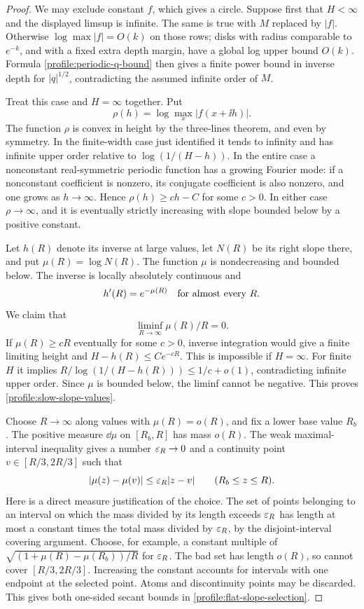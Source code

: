 \begin{proof}
We may exclude constant \(f\), which gives a circle. Suppose first
that \(H<\infty\) and the displayed limsup is infinite. The same
is true with \(M\) replaced by \(|f|\). Otherwise
\(\log\max|f|=O(k)\) on those rows; disks with radius comparable
to \(e^{-k}\), and with a fixed extra depth margin, have a global
log upper bound \(O(k)\). Formula
\eqref{profile:periodic-q-bound} then gives a finite power bound in
inverse depth for \(|q|^{1/2}\), contradicting the assumed infinite
order of \(M\).

Treat this case and \(H=\infty\) together. Put
\[
 \rho(h)=\log\max_x|f(x+\ii h)|.
\]
The function \(\rho\) is convex in height by the three-lines
theorem, and even by symmetry. In the finite-width case just
identified it tends to infinity and has infinite upper order
relative to \(\log(1/(H-h))\). In the entire case a nonconstant
real-symmetric periodic function has a growing Fourier mode:
if a nonconstant coefficient is nonzero, its conjugate coefficient
is also nonzero, and one grows as \(h\to\infty\). Hence
\(\rho(h)\ge c h-C\) for some \(c>0\). In either case
\(\rho\to\infty\), and it is eventually strictly increasing
with slope bounded below by a positive constant.

Let \(h(R)\) denote its inverse at large values, let \(N(R)\) be
its right slope there, and put \(\mu(R)=\log N(R)\). The function
\(\mu\) is nondecreasing and bounded below. The inverse is locally
absolutely continuous and
\[
 h'(R)=e^{-\mu(R)}\quad\hbox{for almost every }R.
\]
We claim that
\begin{equation}
 \label{profile:slow-slope-values}
 \liminf_{R\to\infty}\mu(R)/R=0.
\end{equation}
If \(\mu(R)\ge cR\) eventually for some \(c>0\), inverse
integration would give a finite limiting height and
\(H-h(R)\le Ce^{-cR}\). This is impossible if \(H=\infty\).
For finite \(H\) it implies
\(R/\log(1/(H-h(R)))\le1/c+o(1)\), contradicting infinite
upper order. Since \(\mu\) is bounded below, the liminf cannot be
negative. This proves \eqref{profile:slow-slope-values}.

Choose \(R\to\infty\) along values with \(\mu(R)=o(R)\), and
fix a lower base value \(R_b\). The positive measure \(\dd\mu\)
on \([R_b,R]\) has mass \(o(R)\). The weak maximal-interval
inequality gives a number \(\varepsilon_R\to0\) and a continuity point
\(v\in[R/3,2R/3]\) such that
\begin{equation}
 \label{profile:flat-slope-selection}
 |\mu(z)-\mu(v)|\le\varepsilon_R|z-v|
 \qquad (R_b\le z\le R).
\end{equation}
Here is a direct measure justification of the choice. The set of
points belonging to an interval on which the mass divided by its
length exceeds \(\varepsilon_R\) has length at most a constant times
the total mass divided by \(\varepsilon_R\), by the disjoint-interval
covering argument. Choose, for example, a constant multiple of
\(\sqrt{(1+\mu(R)-\mu(R_b))/R}\) for \(\varepsilon_R\). The bad set
has length \(o(R)\), so cannot cover \([R/3,2R/3]\).
Increasing the constant accounts for intervals with one endpoint
at the selected point. Atoms and discontinuity points may be
discarded. This gives both one-sided secant bounds in
\eqref{profile:flat-slope-selection}.


\end{proof}
